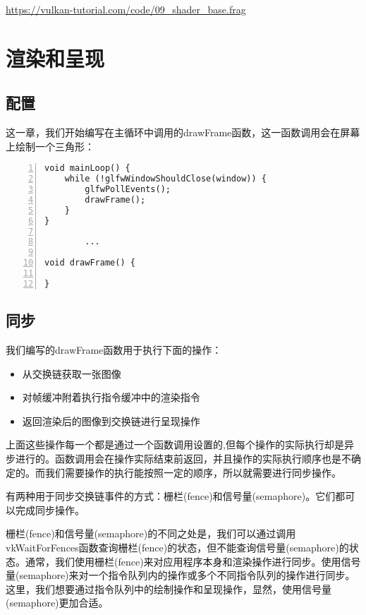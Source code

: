 \documentclass{ctexart}
\begin{document}
\url{https://vulkan-tutorial.com/code/09_shader_base.frag}

\newpage
\section{渲染和呈现}

\subsection{配置}

这一章，我们开始编写在主循环中调用的drawFrame函数，这一函数调用会在屏幕上绘制一个三角形：

\begin{lstlisting}[language={[ANSI]C},keywordstyle=\color{blue!70},commentstyle=\color{red!50!green!50!blue!50},frame=shadowbox, rulesepcolor=\color{red!20!green!20!blue!20},basicstyle=\small,numbers=left, numberstyle=\tiny,breaklines=true]
void mainLoop() {
	while (!glfwWindowShouldClose(window)) {
		glfwPollEvents();
		drawFrame();
	}
}

		...

void drawFrame() {

}
\end{lstlisting}

\subsection{同步}

我们编写的drawFrame函数用于执行下面的操作：

\begin{itemize}
	\item 从交换链获取一张图像
	\item 对帧缓冲附着执行指令缓冲中的渲染指令
	\item 返回渲染后的图像到交换链进行呈现操作
\end{itemize}

上面这些操作每一个都是通过一个函数调用设置的,但每个操作的实际执行却是异步进行的。函数调用会在操作实际结束前返回，并且操作的实际执行顺序也是不确定的。而我们需要操作的执行能按照一定的顺序，所以就需要进行同步操作。

有两种用于同步交换链事件的方式：栅栏(fence)和信号量(semaphore)。它们都可以完成同步操作。

栅栏(fence)和信号量(semaphore)的不同之处是，我们可以通过调用vkWaitForFences函数查询栅栏(fence)的状态，但不能查询信号量(semaphore)的状态。通常，我们使用栅栏(fence)来对应用程序本身和渲染操作进行同步。使用信号量(semaphore)来对一个指令队列内的操作或多个不同指令队列的操作进行同步。这里，我们想要通过指令队列中的绘制操作和呈现操作，显然，使用信号量(semaphore)更加合适。
\end{document}
